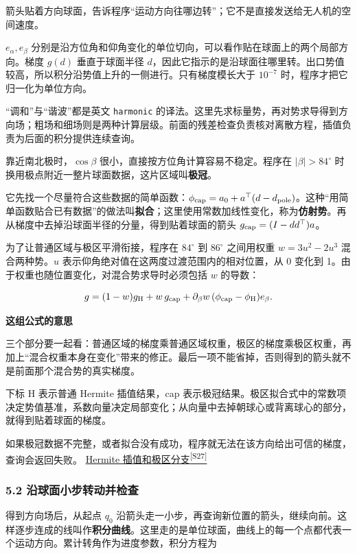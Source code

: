 \documentclass[12pt,a4paper]{article}
\numberwithin{equation}{topic}
\newcommand{\sourceref}[2]{\hyperlink{source-#1}{#2\textsuperscript{[#1]}}}
\begin{document}
箭头贴着方向球面，告诉程序“运动方向往哪边转”；它不是直接发送给无人机的空间速度。


\(e_\alpha,e_\beta\) 分别是沿方位角和仰角变化的单位切向，可以看作贴在球面上的两个局部方向。梯度 \(g(d)\) 垂直于球面半径 \(d\)，因此它指示的是沿球面往哪里转。出口势值较高，所以积分沿势值上升的一侧进行。只有梯度模长大于 \(10^{-7}\) 时，程序才把它归一化为单位方向。

“调和”与“谐波”都是英文 \texttt{harmonic} 的译法。这里先求标量势，再对势求导得到方向场；粗场和细场则是两种计算层级。前面的残差检查负责核对离散方程，插值负责为后面的积分提供连续查询。

靠近南北极时，\(\cos\beta\) 很小，直接按方位角计算容易不稳定。程序在 \(|\beta|>84^\circ\) 时换用极点附近一整片球面数据，这片区域叫\textbf{极冠}。

它先找一个尽量符合这些数据的简单函数：\(\phi_{\rm cap}=a_0+a^\top(d-d_{\rm pole})\)。这种“用简单函数贴合已有数据”的做法叫\textbf{拟合}；这里使用常数加线性变化，称为\textbf{仿射势}。再从梯度中去掉沿球面半径的分量，得到贴着球面的箭头 \(g_{\rm cap}=(I-dd^\top)a\)。

为了让普通区域与极区平滑衔接，程序在 \(84^\circ\) 到 \(86^\circ\) 之间用权重 \(w=3u^2-2u^3\) 混合两种势。\(u\) 表示仰角绝对值在这两度过渡范围内的相对位置，从 0 变化到 1。由于权重也随位置变化，对混合势求导时必须包括 \(w\) 的导数：

\begin{equation}
\label{eq:polar}
g=(1-w)g_{\rm H}+w\,g_{\rm cap}
  +\partial_\beta w\,(\phi_{\rm cap}-\phi_{\rm H})e_\beta.
\end{equation}

\noindent\textbf{这组公式的意思}\par\nobreak
三个部分要一起看：普通区域的梯度乘普通区域权重，极区的梯度乘极区权重，再加上“混合权重本身在变化”带来的修正。最后一项不能省掉，否则得到的箭头就不是前面那个混合势的真实梯度。

下标 H 表示普通 Hermite 插值结果，cap 表示极冠结果。极区拟合式中的常数项决定势值基准，系数向量决定局部变化；从向量中去掉朝球心或背离球心的部分，就得到贴着球面的梯度。


如果极冠数据不完整，或者拟合没有成功，程序就无法在该方向给出可信的梯度，查询会返回失败。 \sourceref{S27}{Hermite 插值和极区分支}

\subsubsection*{5.2 沿球面小步转动并检查}

得到方向场后，从起点 \(q_0\) 沿箭头走一小步，再查询新位置的箭头，继续向前。这样逐步连成的线叫作\textbf{积分曲线}。这里走的是单位球面，曲线上的每一个点都代表一个运动方向。累计转角作为进度参数，积分方程为
\end{document}
